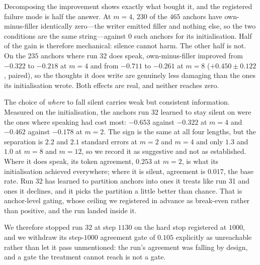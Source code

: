 \documentclass{article} %
\begin{document}
Decomposing the improvement shows exactly what bought it, and the registered failure mode is half the
answer. At $m{=}4$, $230$ of the $465$ anchors have own-minus-filler identically zero---the writer
emitted filler and nothing else, so the two conditions are the same string---against $0$ such anchors
for its initialisation. Half of the gain is therefore mechanical: silence cannot harm. The other half
is not. On the $235$ anchors where run 32 does speak, own-minus-filler improved from $-0.322$ to
$-0.218$ at $m{=}4$ and from $-0.711$ to $-0.261$ at $m{=}8$ ($+0.450 \pm 0.122$, paired), so the
thoughts it does write are genuinely less damaging than the ones its initialisation wrote. Both
effects are real, and neither reaches zero.

The choice of \emph{where} to fall silent carries weak but consistent information. Measured on the
initialisation, the anchors run 32 learned to stay silent on were the ones where speaking had cost
most: $-0.653$ against $-0.322$ at $m{=}4$ and $-0.462$ against $-0.178$ at $m{=}2$. The sign is the
same at all four lengths, but the separation is $2.2$ and $2.1$ standard errors at $m{=}2$ and $m{=}4$
and only $1.3$ and $1.0$ at $m{=}8$ and $m{=}12$, so we record it as suggestive and not as
established. Where it does speak, its token agreement, $0.253$ at $m{=}2$, is what its initialisation
achieved everywhere; where it is silent, agreement is $0.017$, the base rate. Run 32 has learned to
partition anchors into ones it treats like run 31 and ones it declines, and it picks the partition a
little better than chance. That is anchor-level gating, whose ceiling we registered in advance as
break-even rather than positive, and the run landed inside it.

We therefore stopped run 32 at step $1130$ on the hard stop registered at $1000$, and we withdraw its
step-$1000$ agreement gate of $0.105$ explicitly as unreachable rather than let it pass unmentioned:
the run's agreement was falling by design, and a gate the treatment cannot reach is not a gate.
\end{document}
